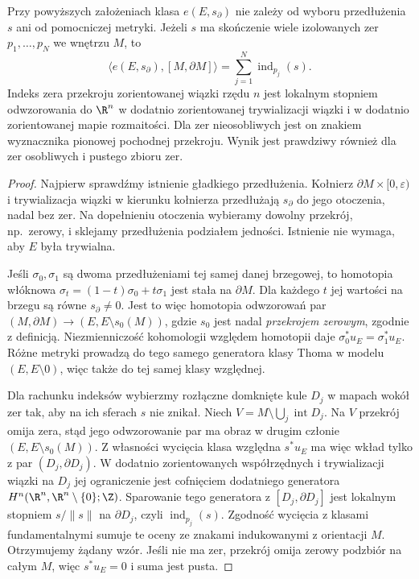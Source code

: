 \begin{twierdzenie}
\label{thm:euler-wzgledna-liczba-indeksow-17}
Przy powyższych założeniach klasa
$e(E,s_{\partial})$ nie zależy od wyboru
przedłużenia $s$ ani od pomocniczej metryki.
Jeżeli $s$ ma skończenie wiele izolowanych
zer $p_1,\ldots,p_N$ we wnętrzu $M$, to
\[
 \bigl\langle e(E,s_{\partial}),[M,\partial M]\bigr\rangle
 =\sum_{j=1}^N\operatorname{ind}_{p_j}(s).
\]
Indeks zera przekroju zorientowanej wiązki rzędu $n$
jest lokalnym stopniem odwzorowania do $\R^n$
w dodatnio zorientowanej trywializacji wiązki
i w dodatnio zorientowanej mapie rozmaitości.
Dla zer nieosobliwych jest on znakiem wyznacznika
pionowej pochodnej przekroju.
Wynik jest prawdziwy również dla zer osobliwych
i pustego zbioru zer.
\end{twierdzenie}
\begin{proof}
Najpierw sprawdźmy istnienie gładkiego przedłużenia.
Kołnierz $\partial M\times[0,\varepsilon)$ i
trywializacja wiązki w kierunku kołnierza
przedłużają $s_{\partial}$ do jego otoczenia,
nadal bez zer. Na dopełnieniu otoczenia wybieramy
dowolny przekrój, np.\ zerowy, i sklejamy
przedłużenia podziałem jedności.
Istnienie nie wymaga, aby $E$ była trywialna.

Jeśli $\sigma_0,\sigma_1$ są dwoma przedłużeniami
tej samej danej brzegowej, to homotopia włóknowa
$\sigma_t=(1-t)\sigma_0+t\sigma_1$ jest stała
na $\partial M$.
Dla każdego $t$ jej wartości na brzegu są równe
$s_{\partial}\ne0$. Jest to więc homotopia
odwzorowań par $(M,\partial M)\to
(E,E\setminus s_0(M))$, gdzie $s_0$ jest nadal
\emph{przekrojem zerowym}, zgodnie z definicją.
Niezmienniczość kohomologii względem homotopii daje
$\sigma_0^*u_E=\sigma_1^*u_E$.
Różne metryki prowadzą do tego samego
generatora klasy Thoma w modelu $(E,E\setminus0)$,
więc także do tej samej klasy względnej.

Dla rachunku indeksów wybierzmy rozłączne
domknięte kule $D_j$ w mapach wokół zer tak,
aby na ich sferach $s$ nie znikał.
Niech $V=M\setminus\bigcup_j\operatorname{int}D_j$.
Na $V$ przekrój omija zera, stąd jego odwzorowanie
par ma obraz w drugim członie
$(E,E\setminus s_0(M))$.
Z własności wycięcia klasa względna
$s^*u_E$ ma więc wkład tylko z par
$(D_j,\partial D_j)$.
W dodatnio zorientowanych współrzędnych
i trywializacji wiązki na $D_j$
jej ograniczenie jest cofnięciem
dodatniego generatora
$H^n(\R^n,\R^n\setminus\{0\};\Z)$.
Sparowanie tego generatora z
$[D_j,\partial D_j]$ jest lokalnym
stopniem $s/\|s\|$ na $\partial D_j$,
czyli $\operatorname{ind}_{p_j}(s)$.
Zgodność wycięcia z klasami fundamentalnymi
sumuje te oceny ze znakami indukowanymi
z orientacji $M$. Otrzymujemy żądany wzór.
Jeśli nie ma zer, przekrój omija
zerowy podzbiór na całym $M$,
więc $s^*u_E=0$ i suma jest pusta.
\end{proof}


